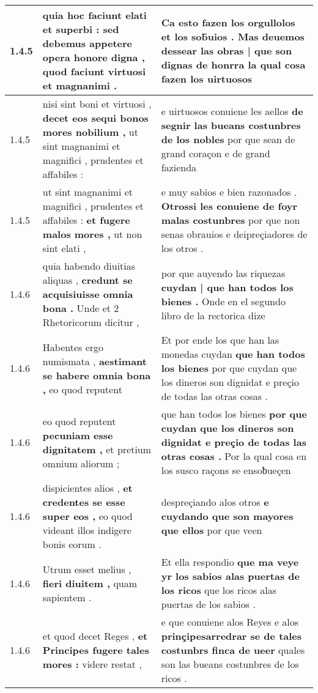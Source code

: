 \begin{tabular}{|p{1cm}|p{6.5cm}|p{6.5cm}|}
1.4.5 & quia hoc faciunt elati et superbi : \textbf{ sed debemus appetere opera honore digna , } quod faciunt virtuosi et magnanimi . & Ca esto fazen los orgullolos et los sob̃uios . \textbf{ Mas deuemos dessear las obras | que son dignas de honrra } la qual cosa fazen los uirtuosos \\\hline
1.4.5 & nisi sint boni et virtuosi , \textbf{ decet eos sequi bonos mores nobilium , } ut sint magnanimi et magnifici , prudentes et affabiles : & e uirtuosos conuiene les aellos \textbf{ de segnir las bueans costunbres de los nobles } por que sean de grand coraçon e de grand fazienda \\\hline
1.4.5 & ut sint magnanimi et magnifici , prudentes et affabiles : \textbf{ et fugere malos mores , } ut non sint elati , & e muy sabios e bien razonados . \textbf{ Otrossi les conuiene de foyr malas costunbres } por que non senas obrauios e deipreçiadores de los otros . \\\hline
1.4.6 & quia habendo diuitias aliquas , \textbf{ credunt se acquisiuisse omnia bona . } Unde et 2 Rhetoricorum dicitur , & por que auyendo las riquezas \textbf{ cuydan | que han todos los bienes . } Onde en el segundo libro de la rectorica dize \\\hline
1.4.6 & Habentes ergo numismata , \textbf{ aestimant se habere omnia bona , } eo quod reputent & Et por ende los que han las monedas cuydan \textbf{ que han todos los bienes } por que cuydan que los dineros son dignidat e preçio de todas las otras cosas . \\\hline
1.4.6 & eo quod reputent \textbf{ pecuniam esse dignitatem , } et pretium omnium aliorum ; & que han todos los bienes \textbf{ por que cuydan que los dineros son dignidat e preçio de todas las otras cosas . } Por la qual cosa en los susco raçons se ensoƀueçen \\\hline
1.4.6 & dispicientes alios , \textbf{ et credentes se esse super eos , } eo quod videant illos indigere bonis eorum . & despreçiando alos otros \textbf{ e cuydando que son mayores que ellos } por que veen \\\hline
1.4.6 & Utrum esset melius , \textbf{ fieri diuitem , } quam sapientem . & Et ella respondio \textbf{ que ma veye yr los sabios alas puertas de los ricos } que los ricos alas puertas de los sabios . \\\hline
1.4.6 & et quod decet Reges , \textbf{ et Principes fugere tales mores : } videre restat , & e que conuiene alos Reyes e alos \textbf{ prinçipesarredrar se de tales costunbrs finca de ueer } quales son las bueans costunbres de los ricos . \\\hline

\end{tabular}
